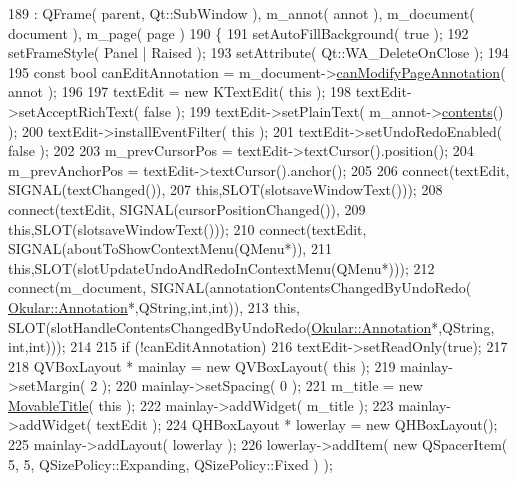 \begin{DoxyCode}
189     : QFrame( parent, Qt::SubWindow ), m\_annot( annot ), m\_document( document ), m\_page( page )
190 \{
191     setAutoFillBackground( \textcolor{keyword}{true} );
192     setFrameStyle( Panel | Raised );
193     setAttribute( Qt::WA\_DeleteOnClose );
194 
195     \textcolor{keyword}{const} \textcolor{keywordtype}{bool} canEditAnnotation = m\_document->\hyperlink{classOkular_1_1Document_acbc3b843b40096c18dbeec805552685a}{canModifyPageAnnotation}( annot );
196 
197     textEdit = \textcolor{keyword}{new} KTextEdit( \textcolor{keyword}{this} );
198     textEdit->setAcceptRichText( \textcolor{keyword}{false} );
199     textEdit->setPlainText( m\_annot->\hyperlink{classOkular_1_1Annotation_a3b0c9fcbe9d01e06bfcc7216d0035908}{contents}() );
200     textEdit->installEventFilter( \textcolor{keyword}{this} );
201     textEdit->setUndoRedoEnabled( \textcolor{keyword}{false} );
202 
203     m\_prevCursorPos = textEdit->textCursor().position();
204     m\_prevAnchorPos = textEdit->textCursor().anchor();
205 
206     connect(textEdit, SIGNAL(textChanged()),
207             \textcolor{keyword}{this},SLOT(slotsaveWindowText()));
208     connect(textEdit, SIGNAL(cursorPositionChanged()),
209             \textcolor{keyword}{this},SLOT(slotsaveWindowText()));
210     connect(textEdit, SIGNAL(aboutToShowContextMenu(QMenu*)),
211             \textcolor{keyword}{this},SLOT(slotUpdateUndoAndRedoInContextMenu(QMenu*)));
212     connect(m\_document, SIGNAL(annotationContentsChangedByUndoRedo(
      \hyperlink{classOkular_1_1Annotation}{Okular::Annotation}*,QString,\textcolor{keywordtype}{int},\textcolor{keywordtype}{int})),
213             \textcolor{keyword}{this}, SLOT(slotHandleContentsChangedByUndoRedo(\hyperlink{classOkular_1_1Annotation}{Okular::Annotation}*,QString,\textcolor{keywordtype}{
      int},\textcolor{keywordtype}{int})));
214 
215     \textcolor{keywordflow}{if} (!canEditAnnotation)
216         textEdit->setReadOnly(\textcolor{keyword}{true});
217 
218     QVBoxLayout * mainlay = \textcolor{keyword}{new} QVBoxLayout( \textcolor{keyword}{this} );
219     mainlay->setMargin( 2 );
220     mainlay->setSpacing( 0 );
221     m\_title = \textcolor{keyword}{new} \hyperlink{classMovableTitle}{MovableTitle}( \textcolor{keyword}{this} );
222     mainlay->addWidget( m\_title );
223     mainlay->addWidget( textEdit );
224     QHBoxLayout * lowerlay = \textcolor{keyword}{new} QHBoxLayout();
225     mainlay->addLayout( lowerlay );
226     lowerlay->addItem( \textcolor{keyword}{new} QSpacerItem( 5, 5, QSizePolicy::Expanding, QSizePolicy::Fixed ) );

\end{DoxyCode}
